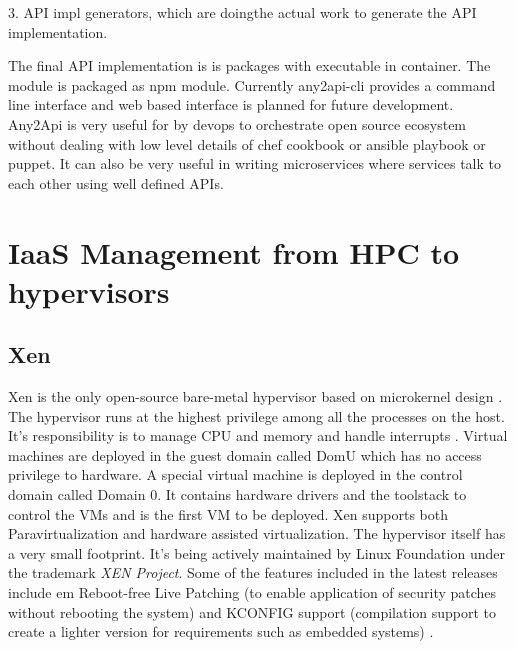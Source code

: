      3. API impl generators, which are doingthe actual work to
        generate the API implementation.

     The final API implementation \cite{www-any2api} is is packages
     with executable in container.  The module is packaged as npm
     module. Currently any2api-cli provides a command line interface
     and web based interface is planned for future
     development. Any2Api is very useful for by devops to orchestrate
     open source ecosystem without dealing with low level details of
     chef cookbook or ansible playbook or puppet. It can also be very
     useful in writing microservices where services talk to each other
     using well defined APIs.

\section{IaaS Management from HPC to hypervisors}
\label{S:o-hypervisors}

\subsection{Xen}

     Xen is the only open-source bare-metal hypervisor based on
     microkernel design \cite{www-xen-wikipedia}. The hypervisor runs
     at the highest privilege among all the processes on the
     host. It's responsibility is to manage CPU and memory and handle
     interrupts \cite{www-xen-overview}. Virtual machines are
     deployed in the guest domain called DomU which has no access
     privilege to hardware. A special virtual machine is deployed in
     the control domain called Domain 0. It contains hardware drivers
     and the toolstack to control the VMs and is the first VM to be
     deployed. Xen supports both Paravirtualization and hardware
     assisted virtualization. The hypervisor itself has a very small
     footprint. It's being actively maintained by Linux Foundation
     under the trademark {\em XEN Project}. Some of the features included
     in the latest releases include {em Reboot-free Live Patching} (to
     enable application of security patches without rebooting the
     system) and KCONFIG support (compilation support to create a
     lighter version for requirements such as embedded systems)
     \cite{www-xen-fl}.
          
